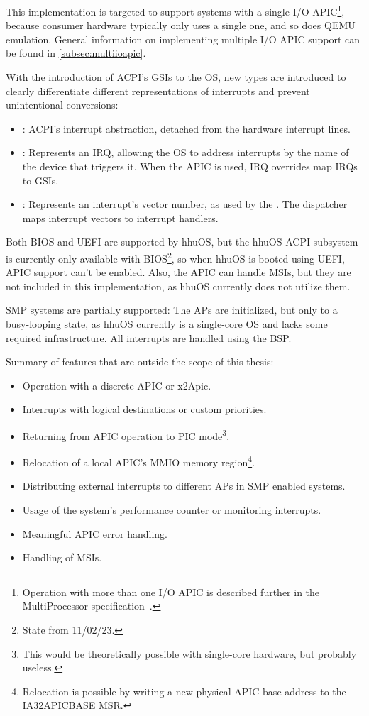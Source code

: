 This implementation is targeted to support systems with a single I/O APIC\footnote{Operation with
  more than one I/O APIC is described further in the MultiProcessor
  specification~\cite[sec.~3.6.8]{mpspec}.}, because consumer hardware typically only uses a single
one, and so does QEMU emulation. General information on implementing multiple I/O APIC support can
be found in \autoref{subsec:multiioapic}.

With the introduction of ACPI's GSIs to the OS, new types are introduced to clearly differentiate
different representations of interrupts and prevent unintentional conversions:

\begin{itemize}
  \item {}: ACPI's interrupt abstraction, detached from the hardware
        interrupt lines.
  \item {}: Represents an IRQ, allowing the OS to address interrupts by
        the name of the device that triggers it. When the APIC is used, IRQ overrides map IRQs to GSIs.
  \item {}: Represents an interrupt's vector number, as used by the
        . The dispatcher maps interrupt vectors to interrupt handlers.
\end{itemize}

Both BIOS and UEFI are supported by hhuOS, but the hhuOS ACPI subsystem is currently only available
with BIOS\footnote{State from 11/02/23.}, so when hhuOS is booted using UEFI, APIC support can't be
enabled. Also, the APIC can handle MSIs, but they are not included in this implementation, as hhuOS
currently does not utilize them.

SMP systems are partially supported: The APs are initialized, but only to a busy-looping state, as
hhuOS currently is a single-core OS and lacks some required infrastructure. All interrupts are
handled using the BSP\@.

Summary of features that are outside the scope of this thesis:

\begin{itemize}
  \item Operation with a discrete APIC or x2Apic.
  \item Interrupts with logical destinations or custom priorities.
  \item Returning from APIC operation to PIC mode\footnote{This would be theoretically possible with
          single-core hardware, but probably useless.}.
  \item Relocation of a local APIC's MMIO memory region\footnote{Relocation is possible by writing a new
          physical APIC base address to the IA32\textunderscore{}APIC\textunderscore{}BASE MSR.}.
  \item Distributing external interrupts to different APs in SMP enabled systems.
  \item Usage of the system's performance counter or monitoring interrupts.
  \item Meaningful APIC error handling.
  \item Handling of MSIs.
\end{itemize}

